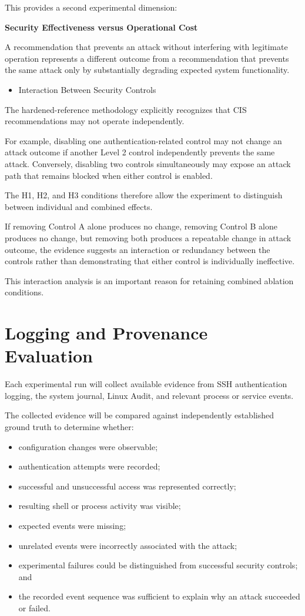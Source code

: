 \documentclass[11pt]{article}
\begin{document}
This provides a second experimental dimension:

\textbf{Security Effectiveness versus Operational Cost}

A recommendation that prevents an attack without interfering with
legitimate operation represents a different outcome from a
recommendation that prevents the same attack only by substantially
degrading expected system functionality.

\begin{itemize}
\item Interaction Between Security Controls
\end{itemize}

The hardened-reference methodology explicitly recognizes that CIS
recommendations may not operate independently.

For example, disabling one authentication-related control may not change
an attack outcome if another Level 2 control independently prevents the
same attack. Conversely, disabling two controls simultaneously may
expose an attack path that remains blocked when either control is
enabled.

The H1, H2, and H3 conditions therefore allow the experiment to
distinguish between individual and combined effects.

If removing Control A alone produces no change, removing Control B alone
produces no change, but removing both produces a repeatable change in
attack outcome, the evidence suggests an interaction or redundancy
between the controls rather than demonstrating that either control is
individually ineffective.

This interaction analysis is an important reason for retaining combined
ablation conditions.
\section{Logging and Provenance Evaluation}
\label{sec:org0d4d8a0}
Each experimental run will collect available evidence from SSH
authentication logging, the system journal, Linux Audit, and relevant
process or service events.

The collected evidence will be compared against independently
established ground truth to determine whether:

\begin{itemize}
\item configuration changes were observable;
\item authentication attempts were recorded;
\item successful and unsuccessful access was represented correctly;
\item resulting shell or process activity was visible;
\item expected events were missing;
\item unrelated events were incorrectly associated with the attack;
\item experimental failures could be distinguished from successful security
controls; and
\item the recorded event sequence was sufficient to explain why an attack
succeeded or failed.
\end{itemize}
\end{document}
